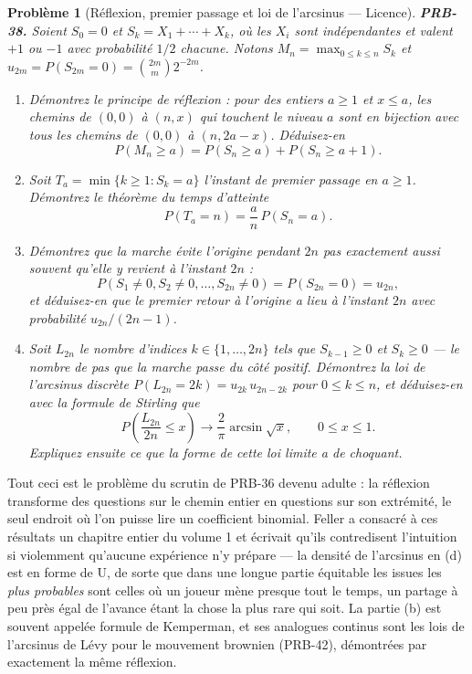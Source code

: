 \documentclass[11pt]{article}
\newtheorem{problem}{Problème}
\begin{document}
\bigskip

\begin{problem}[{Réflexion, premier passage et loi de l'arcsinus --- Licence}]
\textbf{PRB-38.} Soient $ S_0 = 0 $ et $ S_k = X_1 + \cdots + X_k $, où les $ X_i $ sont
indépendantes et valent $ +1 $ ou $ -1 $ avec probabilité $ 1/2 $ chacune. Notons
$ M_n = \max_{0 \le k \le n} S_k $ et $ u_{2m} = P(S_{2m} = 0) = \binom{2m}{m} 2^{-2m} $.
\begin{enumerate}
\item[(a)] Démontrez le principe de réflexion : pour des entiers $ a \ge 1 $ et $ x \le a $, les
chemins de $ (0,0) $ à $ (n,x) $ qui touchent le niveau $ a $ sont en bijection avec
\textit{tous} les chemins de $ (0,0) $ à $ (n, 2a - x) $. Déduisez-en
\[ P(M_n \ge a) = P(S_n \ge a) + P(S_n \ge a+1) . \]
\item[(b)] Soit $ T_a = \min\{ k \ge 1 : S_k = a \} $ l'instant de premier passage en $ a \ge 1 $.
Démontrez le théorème du temps d'atteinte
\[ P(T_a = n) = \frac{a}{n}\, P(S_n = a) . \]
\item[(c)] Démontrez que la marche évite l'origine pendant $ 2n $ pas exactement aussi souvent qu'elle y
revient à l'instant $ 2n $ :
\[ P(S_1 \ne 0, S_2 \ne 0, \dots, S_{2n} \ne 0) = P(S_{2n} = 0) = u_{2n} , \]
et déduisez-en que le premier retour à l'origine a lieu à l'instant $ 2n $ avec probabilité
$ u_{2n}/(2n-1) $.
\item[(d)] Soit $ L_{2n} $ le nombre d'indices $ k \in \{1, \dots, 2n\} $ tels que
$ S_{k-1} \ge 0 $ et $ S_k \ge 0 $ --- le nombre de pas que la marche passe du côté positif.
Démontrez la loi de l'arcsinus discrète $ P(L_{2n} = 2k) = u_{2k}\, u_{2n-2k} $ pour
$ 0 \le k \le n $, et déduisez-en avec la formule de Stirling que
\[ P\!\left( \frac{L_{2n}}{2n} \le x \right) \longrightarrow \frac{2}{\pi}\arcsin\sqrt{x},
 \qquad 0 \le x \le 1 . \]
Expliquez ensuite ce que la forme de cette loi limite a de choquant.
\end{enumerate}

\end{problem}

\noindent Tout ceci est le problème du scrutin de PRB-36 devenu adulte : la réflexion
transforme des questions sur le chemin entier en questions sur son extrémité, le seul endroit où
l'on puisse lire un coefficient binomial. Feller a consacré à ces résultats un chapitre entier du
volume 1 et écrivait qu'ils contredisent l'intuition si violemment qu'aucune expérience n'y
prépare --- la densité de l'arcsinus en (d) est en forme de U, de sorte que dans une longue partie
équitable les issues les \textit{plus probables} sont celles où un joueur mène presque tout le temps,
un partage à peu près égal de l'avance étant la chose la plus rare qui soit. La partie (b) est
souvent appelée formule de Kemperman, et ses analogues continus sont les lois de l'arcsinus de Lévy
pour le mouvement brownien (PRB-42), démontrées par exactement la même réflexion.
\end{document}
